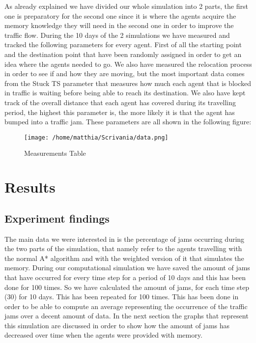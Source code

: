 \documentclass[a4paper,hidelinks]{article}
\begin{document}
As already explained we have divided our whole simulation into 2 parts, the first one is preparatory for the second one since it is where the agents acquire the memory knowledge they will need in the second one in order to improve the traffic flow. During the 10 days of the 2 simulations we have measured and tracked the following parameters for every agent. First of all the starting point and the destination point that have been randomly assigned in order to get an idea where the agents needed to go. We also have measured the relocation process in order to see if and how they are moving, but the most important data comes from the Stuck TS parameter that measures how much each agent that is blocked in traffic is waiting before being able to reach its destination. We also have kept track of the overall distance that each agent has covered during its travelling period, the highest this parameter is, the more likely it is that the agent has bumped into a traffic jam. These parameters are all shown in the following figure:

\begin{figure}[ht!]
\centering
\texttt{[image: /home/matthia/Scrivania/data.png]}
\caption{Measurements Table \label{overflow}}
\end{figure} 


\section{Results}
\subsection{Experiment findings}
The main data we were interested in is the percentage of jams occurring during the two parts of the simulation, that namely refer to the agents travelling with the normal A* algorithm and with the weighted version of it that simulates the memory. During our computational simulation we have saved the amount of jams that have occurred for every time step for a period of 10 days and this has been done for 100 times. So we have calculated the amount of jams, for each time step (30) for 10 days. This has been repeated for 100 times. This has been done in order to be able to compute an average representing the occurrence of the traffic jams over a decent amount of data. In the next section the graphs that represent this simulation are discussed in order to show how the amount of jams has decreased over time when the agents were provided with memory.  
\end{document}
